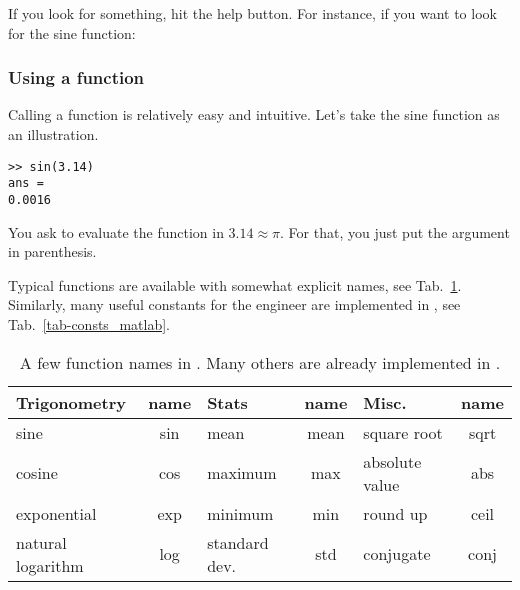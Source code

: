 If you look for something, hit the help button.
For instance, if you want to look for the sine function:




\subsubsection{Using a function}
Calling a function is relatively easy and intuitive. Let's take the sine function as an illustration. 

\begin{lstlisting}
>> sin(3.14)
ans =
0.0016
\end{lstlisting}


You ask \matlab to evaluate the function  in $3.14\approx \pi$. 
For that, you just put the argument in parenthesis.


Typical functions are available with somewhat explicit names, see Tab.~\ref{tab-funcs_matlab}. Similarly, many useful constants for the engineer are implemented in \matlab, see Tab.~\ref{tab-consts_matlab}.

\begin{table}[h!]
	\caption{A few function names in \matlab. Many others are already implemented in \matlab.}
	\label{tab-funcs_matlab}
\center
\begin{tabular}{|l|c||l|c||l|c|}
	\hline
	Trigonometry & name & Stats & name & Misc. & name\\
	\hline
	sine & sin  &
		mean & mean &
			square root & sqrt \\
			
	cosine & cos &
		maximum & max &
			absolute value & abs \\

	exponential & exp &
		minimum & min &
			round up & ceil \\		

		
	natural logarithm & log &
		standard dev. & std &
			conjugate & conj \\
	
	\hline
\end{tabular}
\end{table}


